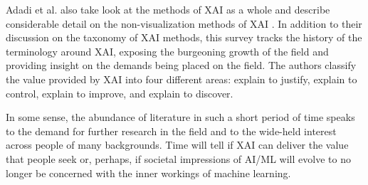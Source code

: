Adadi et al. also take look at the methods of XAI as a whole and describe considerable detail on the non-visualization methods of XAI \cite{Adadi2018}.  In addition to their discussion on the taxonomy of XAI methods, this survey tracks the history of the terminology around XAI, exposing the burgeoning growth of the field and providing insight on the demands being placed on the field.  The authors classify the value provided by XAI into four different areas: explain to justify, explain to control, explain to improve, and explain to discover.

In some sense, the abundance of literature in such a short period of time speaks to the demand for further research in the field and to the wide-held interest across people of many backgrounds.  Time will tell if XAI can deliver the value that people seek or, perhaps, if societal impressions of AI/ML will evolve to no longer be concerned with the inner workings of machine learning.

